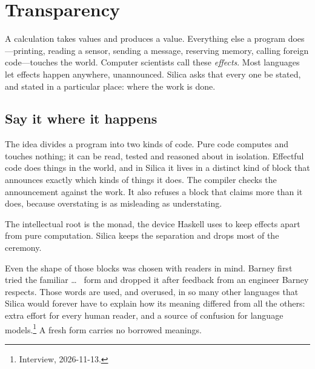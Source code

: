 \chapter{Transparency}
\label{ch:effects}

A calculation takes values and produces a value. Everything else a program
does---printing, reading a sensor, sending a message, reserving memory, calling
foreign code---touches the world. Computer scientists call these
\emph{effects}. Most languages let effects happen anywhere, unannounced.
Silica asks that every one be stated, and stated in a particular place: where
the work is done.

\section{Say it where it happens}

The idea divides a program into two kinds of code. Pure code computes and
touches nothing; it can be read, tested and reasoned about in isolation.
Effectful code does things in the world, and in Silica it lives in a distinct
kind of block that announces exactly which kinds of things it does. The compiler
checks the announcement against the work. It also refuses a block that claims
more than it does, because overstating is as misleading as understating.

The intellectual root is the monad, the device Haskell uses to keep effects
apart from pure computation. Silica keeps the separation and drops most of the
ceremony.

Even the shape of those blocks was chosen with readers in mind. Barney first
tried the familiar  \ldots\  form and dropped it after
feedback from an engineer Barney respects. Those words are used, and overused,
in so many other languages that Silica would forever have to explain how its
meaning differed from all the others: extra effort for every human reader, and
a source of confusion for language models.\footnote{Interview, 2026-11-13.} A
fresh form carries no borrowed meanings.

